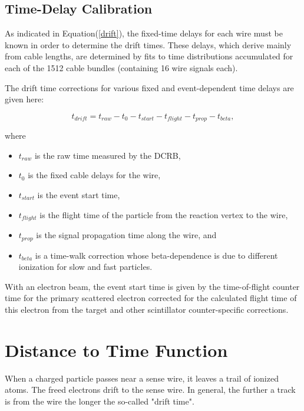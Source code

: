 \documentclass{article}
\begin{document}
\subsection{Time-Delay Calibration}
\label{tdlycal}

As indicated in Equation(\ref{drift}), the fixed-time delays for each wire must be 
known in order to determine the drift times. These delays, which derive mainly 
from cable lengths, are determined by fits to time distributions accumulated
for each of the 1512 cable bundles (containing 16 wire signals each).

The drift time corrections for various fixed and event-dependent
time delays are given here:

\begin{equation} 
\label{drift}
t_{drift} = t_{raw} - t_{0} - t_{start} - t_{flight} - t_{prop} - t_{beta},
\end{equation}

\noindent
where
\begin{itemize} 
\item $t_{raw}$ is the raw time measured by the DCRB, 
\item $t_0$ is the fixed cable delays for the wire, 
\item $t_{start}$ is the event start time, 
\item $t_{flight}$ is the flight time of the particle from the reaction vertex to the wire, 
\item $t_{prop}$ is the signal propagation time along the wire, and 
\item $t_{beta}$ is a time-walk correction whose beta-dependence is due to different 
ionization for slow and fast particles.  
\end{itemize} 

With an electron beam, the event start time is 
given by the time-of-flight counter time for the primary scattered electron 
corrected for the calculated flight time of this electron from the target
and other scintillator counter-specific corrections.



\section{Distance to Time Function}
\label{funcpar} 
When a charged particle passes near a sense wire, it leaves a 
trail of ionized atoms.  The freed electrons drift to the sense wire.  In general,
the further a track is from the wire the longer the so-called "drift time".
\end{document}
